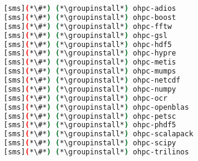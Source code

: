 \begin{lstlisting}[language=bash,keywords={},upquote=true,keepspaces]
[sms](*\#*) (*\groupinstall*) ohpc-adios        
[sms](*\#*) (*\groupinstall*) ohpc-boost        
[sms](*\#*) (*\groupinstall*) ohpc-fftw         
[sms](*\#*) (*\groupinstall*) ohpc-gsl          
[sms](*\#*) (*\groupinstall*) ohpc-hdf5         
[sms](*\#*) (*\groupinstall*) ohpc-hypre        
[sms](*\#*) (*\groupinstall*) ohpc-metis        
[sms](*\#*) (*\groupinstall*) ohpc-mumps        
[sms](*\#*) (*\groupinstall*) ohpc-netcdf       
[sms](*\#*) (*\groupinstall*) ohpc-numpy        
[sms](*\#*) (*\groupinstall*) ohpc-ocr
[sms](*\#*) (*\groupinstall*) ohpc-openblas     
[sms](*\#*) (*\groupinstall*) ohpc-petsc        
[sms](*\#*) (*\groupinstall*) ohpc-phdf5        
[sms](*\#*) (*\groupinstall*) ohpc-scalapack    
[sms](*\#*) (*\groupinstall*) ohpc-scipy        
[sms](*\#*) (*\groupinstall*) ohpc-trilinos     
\end{lstlisting}
